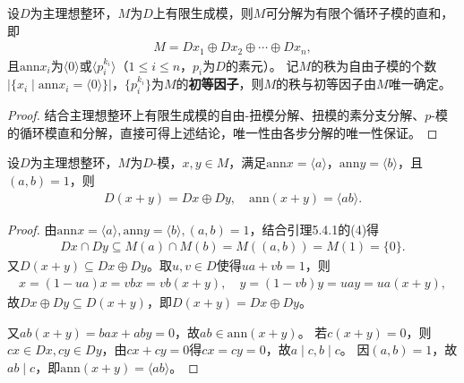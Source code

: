\documentclass[../../main.tex]{subfiles}%
\begin{document}
\begin{theorem}
设$D$为主理想整环，$M$为$D$上有限生成模，则$M$可分解为有限个循环子模的直和，即
\begin{align*}
M=Dx_1\oplus Dx_2\oplus\cdots\oplus Dx_n,
\end{align*}
且$\mathrm{ann}x_i$为$\langle0\rangle$或$\langle p_i^{k_i}\rangle$（$1\leqslant i\leqslant n$，$p_i$为$D$的素元）。
记$M$的秩为自由子模的个数$|\{x_i\mid \mathrm{ann}x_i=\langle0\rangle\}|$，$\{p_i^{k_i}\}$为$M$的\textbf{初等因子}，则$M$的秩与初等因子由$M$唯一确定。
\end{theorem}
\begin{proof}
结合主理想整环上有限生成模的自由-扭模分解、扭模的素分支分解、$p$-模的循环模直和分解，直接可得上述结论，唯一性由各步分解的唯一性保证。
\end{proof}

\begin{lemma}
设$D$为主理想整环，$M$为$D$-模，$x,y\in M$，满足$\mathrm{ann}x=\langle a\rangle$，$\mathrm{ann}y=\langle b\rangle$，且$(a,b)=1$，则
\begin{align*}
D(x+y)=Dx\oplus Dy,\quad \mathrm{ann}(x+y)=\langle ab\rangle.
\end{align*}
\end{lemma}
\begin{proof}
由$\mathrm{ann}x=\langle a\rangle,\mathrm{ann}y=\langle b\rangle,(a,b)=1$，结合引理5.4.1的(4)得
\begin{align*}
Dx\cap Dy\subseteq M(a)\cap M(b)=M((a,b))=M(1)=\{0\}.
\end{align*}
又$D(x+y)\subseteq Dx\oplus Dy$。取$u,v\in D$使得$ua+vb=1$，则
\begin{align*}
x=(1-ua)x=vbx=vb(x+y),\quad y=(1-vb)y=uay=ua(x+y),
\end{align*}
故$Dx\oplus Dy\subseteq D(x+y)$，即$D(x+y)=Dx\oplus Dy$。

又$ab(x+y)=bax+aby=0$，故$ab\in\mathrm{ann}(x+y)$。
若$c(x+y)=0$，则$cx\in Dx,cy\in Dy$，由$cx+cy=0$得$cx=cy=0$，故$a\mid c,b\mid c$。
因$(a,b)=1$，故$ab\mid c$，即$\mathrm{ann}(x+y)=\langle ab\rangle$。
\end{proof}
\end{document}
